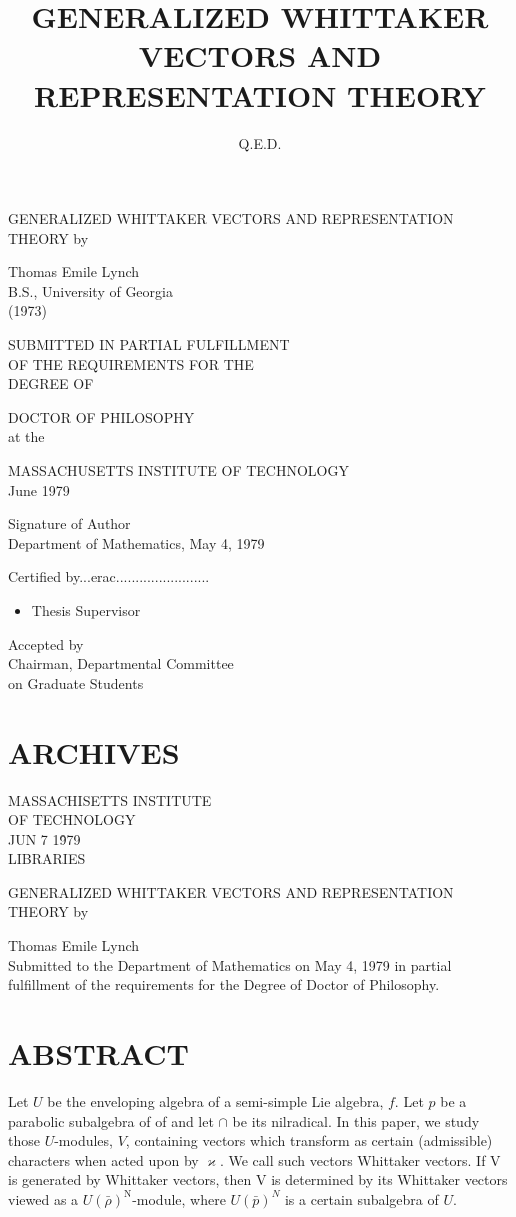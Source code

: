 \documentclass[10pt]{article}
\author{Q.E.D.}
\date{}
\begin{document}
\title{GENERALIZED WHITTAKER VECTORS AND REPRESENTATION THEORY}
\maketitle
GENERALIZED WHITTAKER VECTORS AND REPRESENTATION THEORY by

Thomas Emile Lynch\\
B.S., University of Georgia\\
(1973)

SUBMITTED IN PARTIAL FULFILLMENT\\
OF THE REQUIREMENTS FOR THE\\
DEGREE OF

DOCTOR OF PHILOSOPHY\\
at the

MASSACHUSETTS INSTITUTE OF TECHNOLOGY\\
June 1979

Signature of Author\\
Department of Mathematics, May 4, 1979

Certified by...erac........................

\begin{itemize}
  \item Thesis Supervisor
\end{itemize}

Accepted by\\
Chairman, Departmental Committee\\
on Graduate Students

\section{ARCHIVES}
MASSACHISETTS INSTITUTE\\
OF TECHNOLOGY\\
JUN 7 19̂79\\
LIBRARIES

GENERALIZED WHITTAKER VECTORS AND REPRESENTATION THEORY by

Thomas Emile Lynch\\
Submitted to the Department of Mathematics on May 4, 1979 in partial fulfillment of the requirements for the Degree of Doctor of Philosophy.

\section{ABSTRACT}
Let $U$ be the enveloping algebra of a semi-simple Lie algebra, $f$. Let $p$ be a parabolic subalgebra of of and let $\cap$ be its nilradical. In this paper, we study those $U$-modules, $V$, containing vectors which transform as certain (admissible) characters when acted upon by $\varkappa$. We call such vectors Whittaker vectors. If V is generated by Whittaker vectors, then V is determined by its Whittaker vectors viewed as a $U(\bar{\rho})^{\mathrm{N}}$-module, where $U(\bar{p})^{N}$ is a certain subalgebra of $U$.
\end{document}
